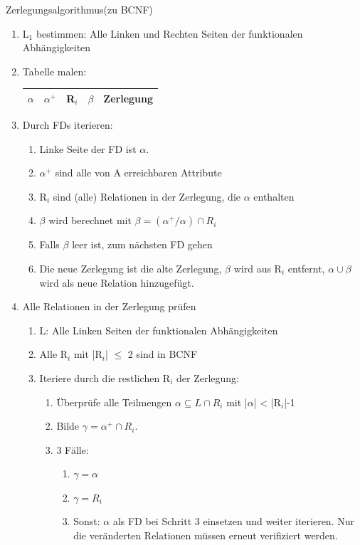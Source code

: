 \documentclass{article}
\begin{document}
\begin{block}{Zerlegungsalgorithmus(zu BCNF)}
  \begin{enumerate}
    \item L$_1$ bestimmen: Alle Linken und Rechten Seiten der funktionalen Abhängigkeiten
    \item Tabelle malen:
    \begin{tabular}{|P{1cm}|P{1cm}|P{1cm}|P{1cm}|p{2cm}|}
      \hline
      $\alpha$ & $\alpha^+$ & R$_i$ & $\beta$ & Zerlegung \\
      \hline
    \end{tabular}
    \item Durch FDs iterieren:
    \begin{enumerate}
      \item Linke Seite der FD ist $\alpha$.
      \item $\alpha^+$ sind alle von A erreichbaren Attribute
      \item R$_i$ sind (alle) Relationen in der Zerlegung, die $\alpha$ enthalten
      \item $\beta$ wird berechnet mit $\beta = (\alpha^+/\alpha)\cap R_i$
      \item Falls $\beta$ leer ist, zum nächsten FD gehen
      \item Die neue Zerlegung ist die alte Zerlegung, $\beta$ wird aus R$_i$ entfernt, $\alpha\cup\beta$ wird als neue Relation hinzugefügt.
    \end{enumerate}
    \item Alle Relationen in der Zerlegung prüfen
    \begin{enumerate}
      \item L: Alle Linken Seiten der funktionalen Abhängigkeiten
      \item Alle R$_i$ mit |R$_i$| $\leq$ 2 sind in BCNF
      \item Iteriere durch die restlichen R$_i$ der Zerlegung:
      \begin{enumerate}
        \item Überprüfe alle Teilmengen $\alpha \subseteq L \cap R_i$ mit |$\alpha$| < |R$_i$|-1
        \item Bilde $\gamma = \alpha^+\cap R_i$.
        \item 3 Fälle:
        \begin{enumerate}
          \item $\gamma = \alpha$ \checkmark
          \item $\gamma = R_i$ \checkmark
          \item Sonst: $\alpha$ als FD bei Schritt 3 einsetzen und weiter iterieren. Nur die veränderten Relationen müssen erneut verifiziert werden.
        \end{enumerate}
      \end{enumerate}
    \end{enumerate}
  \end{enumerate}
\end{block}
\end{document}
